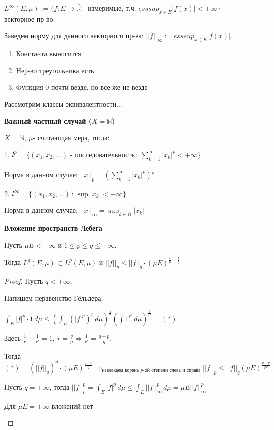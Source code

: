 \begin{definition}
    $L^{\infty} (E, \mu) := \{ f: E \rightarrow \bar{\mathbb{R}}$ - измеримые, т.ч. $esssup_{x\in E} |f(x)| < +\infty \}$ - векторное пр-во.

    Заведем норму для данного векторного пр-ва: $|| f ||_{\infty} := esssup_{x\in E} |f(x)|$.

    \begin{enumerate}
        \item Константа выносится
        \item Нер-во треугольника есть
        \item Функция 0 почти везде, но все же не везде
    \end{enumerate}

    Рассмотрим классы эквивалентности...

    \textbf{Важный частный случай ($X = \mathbb{N}$)}

    $X = \mathbb{N}$, $\mu$- считающая мера, тогда:

    1. $l^p = \{ (x_1, x_2, \ldots) \text{ - последовательность} \, : \, \sum_{k = 1}^{\infty} |x_k|^p < +\infty \}$

        Норма в данном случае: $|| x ||_p = \left( \sum_{k = 1}^{\infty} |x_k|^p \right)^{\frac{1}{p}}$

    2. $l^\infty = \{ (x_1, x_2, \ldots) \, : \, \sup |x_k| < +\infty \}$

        Норма в данном случае: $|| x ||_{\infty} = \sup_{k \in \mathbb{N}} |x_k|$
\end{definition}

\begin{theorem}
    \textbf{Вложение пространств Лебега}

    Пусть $\mu E < +\infty$ и $1 \leqslant p \leqslant q \leqslant +\infty$.

    Тогда $L^q (E, \mu) \subset L^p (E, \mu)$ и $||f||_p \leqslant ||f||_q \cdot (\mu E)^{\frac{1}{p}-\frac{1}{q}}$
\end{theorem}

\begin{proof}
    Пусть $q < +\infty$.

    Напишем неравенство Гёльдера:
    
    $\int_E |f|^p \cdot 1 \, d\mu \leqslant \left( \int_E \left(|f|^p\right)^{r} \, d\mu \right)^{\frac{1}{r}} \left( \int 1^{r'} \, d\mu \right)^{\frac{1}{r'}} = (*)$

    Здесь $\frac{1}{r} + \frac{1}{r'} = 1, \ r = \frac{q}{p} \Rightarrow \frac{1}{r'} = \frac{q - p}{q}$.

    Тогда $(*) = \left(||f||_q\right)^p \cdot (\mu E)^{\frac{q - p}{q}} \Rightarrow_{\text{извлекаем корень $p$-ой степени слева и справа}} ||f||_p \leqslant ||f||_q (\mu E)^{\frac{q - p}{pq}}$

    Пусть $q = +\infty$, тогда $||f||_p^p = \int_E |f|^p \, d\mu \leqslant \int_E ||f||_\infty^p \, d\mu = \mu E ||f||_\infty^p$

    \begin{remark}
        Для $\mu E = +\infty$ вложений нет
    \end{remark}
\end{proof}

